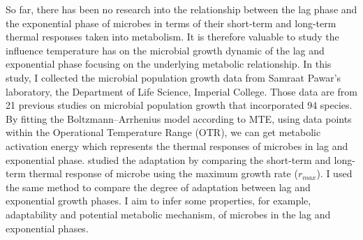 \documentclass[a4paper]{article}
\begin{document}
So far, there has been no research into the relationship between the lag phase and the exponential phase of microbes in terms of their short-term and long-term thermal responses taken into metabolism. It is therefore valuable to study the influence temperature has on the microbial growth dynamic of the lag and exponential phase focusing on the underlying metabolic relationship. In this study, I collected the microbial population growth data from Samraat Pawar's laboratory, the Department of Life Science, Imperial College. Those data are from 21 previous studies on microbial population growth that incorporated 94 species. By fitting the Boltzmann–Arrhenius model according to MTE, using data points within the Operational Temperature Range (OTR), we can get metabolic activation energy which represents the thermal responses of microbes in lag and exponential phase. \citealt{smith2019community} studied the adaptation by comparing the short-term and long-term thermal response of microbe using the maximum growth rate ($r_{max}$). I used the same method to compare the degree of adaptation between lag and exponential growth phases. I aim to infer some properties, for example, adaptability and potential metabolic mechanism, of microbes in the lag and exponential phases. \\


\end{document}
